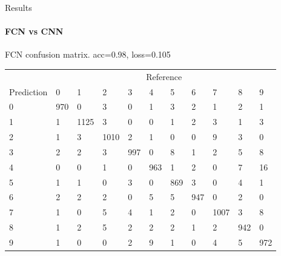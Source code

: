 \documentclass{beamer}
\begin{document}
\begin{darkframes}
    \begin{frame}{Results}
      \framesubtitle{FCN vs CNN}
      \begin{block}
      {\small{FCN confusion matrix. acc=0.98, loss=0.105}}
      \end{block}
        \tiny{\begin{table}[]
            \begin{tabular}{lllllllllll}
             & \multicolumn{10}{c}{Reference} \\
            Prediction & 0 & 1 & 2 & 3 & 4 & 5 & 6 & 7 & 8 & 9 \\
            0 & 970 & 0 & 3 & 0 & 1 & 3 & 2 & 1 & 2 & 1 \\
            1 & 1 & 1125 & 3 & 0 & 0 & 1 & 2 & 3 & 1 & 3 \\
            2 & 1 & 3 & 1010 & 2 & 1 & 0 & 0 & 9 & 3 & 0 \\
            3 & 2 & 2 & 3 & 997 & 0 & 8 & 1 & 2 & 5 & 8 \\
            4 & 0 & 0 & 1 & 0 & 963 & 1 & 2 & 0 & 7 & 16 \\
            5 & 1 & 1 & 0 & 3 & 0 & 869 & 3 & 0 & 4 & 1 \\
            6 & 2 & 2 & 2 & 0 & 5 & 5 & 947 & 0 & 2 & 0 \\
            7 & 1 & 0 & 5 & 4 & 1 & 2 & 0 & 1007 & 3 & 8 \\
            8 & 1 & 2 & 5 & 2 & 2 & 2 & 1 & 2 & 942 & 0 \\
            9 & 1 & 0 & 0 & 2 & 9 & 1 & 0 & 4 & 5 & 972
            \end{tabular}
            \end{table}}
    \end{frame}


\end{darkframes}
\end{document}
